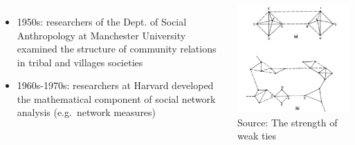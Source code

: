 \documentclass[8pt]{beamer}
\begin{document}
\begin{frame}
\frametitle{\insertsection}

\begin{columns}[c]
{\color{blue}{Anthropology}}
	\begin{itemize}
	\item 1950s: researchers of the Dept. of Social Anthropology at Manchester University examined the structure of community relations in tribal and villages societies
	\item 1960s-1970s: researchers at Harvard developed the mathematical component of social network analysis (e.g.\ network measures)
	\end{itemize}


\centering
\includegraphics[width=\linewidth]{granovetter}\\
\tiny Source: The strength of weak ties \cite{Granovetter1973}
\end{columns}

\end{frame}

\end{document}
